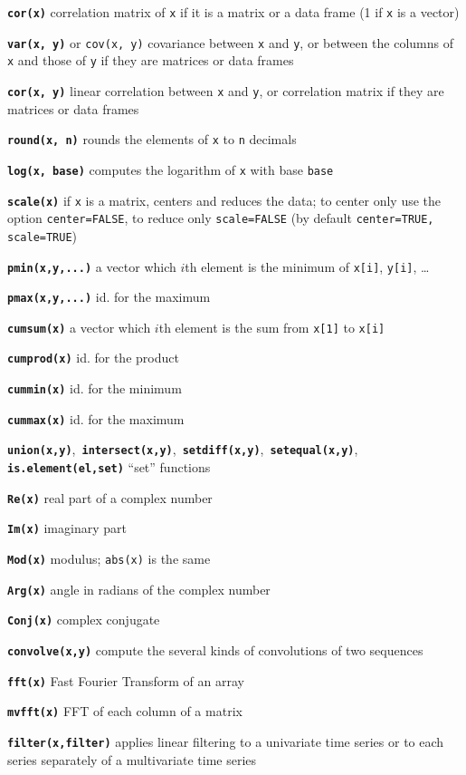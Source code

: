 \documentclass[10pt,landscape]{article}
\newcommand{\code}{\texttt}
\newcommand{\bcode}[1]{\texttt{\textbf{#1}}}
\begin{document}
\begin{multicols*}{3}
\bcode{cor(x)}  correlation matrix of \code{x} if it is a matrix or a
data frame (1 if \code{x} is a vector)

\bcode{var(x, y)} or \code{cov(x, y)}  covariance between \code{x} and \code{y}, or between the columns of \code{x} and those of \code{y} if they are matrices or data frames

\bcode{cor(x, y)}  linear correlation between \code{x} and \code{y}, or correlation matrix if they are matrices or data frames

\bcode{round(x, n)}  rounds the elements of \code{x} to \code{n}
decimals

\bcode{log(x, base)}  computes the logarithm of \code{x} with base \code{base}

\bcode{scale(x)}  if \code{x} is a matrix, centers and reduces the data; to center only use the option \code{center=FALSE}, to reduce only \code{scale=FALSE} (by default \code{center=TRUE, scale=TRUE})

\bcode{pmin(x,y,...)}  a vector which $i$th element is the minimum of \code{x[i]}, \code{y[i]}, \ldots

\bcode{pmax(x,y,...)}  id. for the maximum

\bcode{cumsum(x)}  a vector which $i$th element is the sum from \code{x[1]} to \code{x[i]}

\bcode{cumprod(x)}  id. for the product

\bcode{cummin(x)}  id. for the minimum

\bcode{cummax(x)}  id. for the maximum

\bcode{union(x,y)},~\bcode{intersect(x,y)},~\bcode{setdiff(x,y)},~\bcode{setequal(x,y)}, \bcode{is.element(el,set)} ``set'' functions

\bcode{Re(x)} real part of a complex number

\bcode{Im(x)} imaginary part

\bcode{Mod(x)} modulus; \code{abs(x)} is the same

\bcode{Arg(x)} angle in radians of the complex number

\bcode{Conj(x)} complex conjugate

\bcode{convolve(x,y)} compute the several kinds of
     convolutions of two sequences

\bcode{fft(x)} Fast Fourier Transform of an array

\bcode{mvfft(x)} FFT of each column of a matrix

\bcode{filter(x,filter)} applies linear filtering to a univariate time series or to each
     series separately of a multivariate time series


\end{multicols*}
\end{document}
